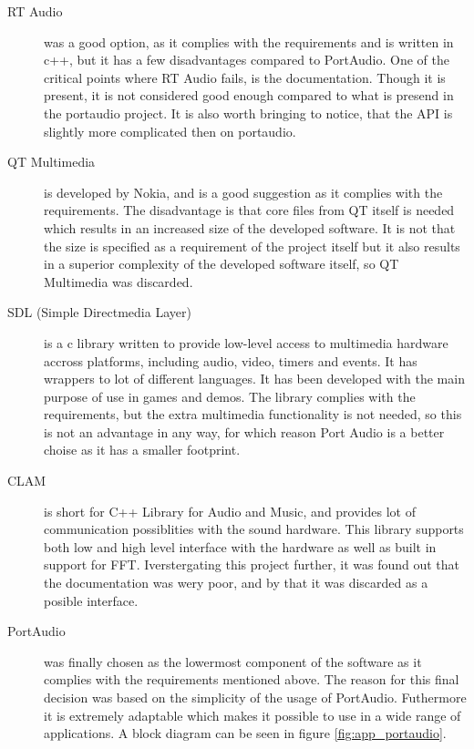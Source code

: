 \begin{description}
\item[RT Audio\footnotemark] was a good option, as it complies with the requirements and is written in c++, but it has a few disadvantages compared to PortAudio. One of the critical points where RT Audio fails, is the documentation. Though it is present, it is not considered good enough compared to what is presend in the portaudio project. It is also worth bringing to notice, that the API is slightly more complicated then on portaudio.



\item[QT Multimedia\footnotemark] is developed by Nokia, and is a good suggestion as it complies with the requirements. The disadvantage is that core files from QT itself is needed which results in an increased size of the developed software. It is not that the size is specified as a requirement of the project itself but it also results in a superior complexity of the developed software itself, so QT Multimedia was discarded.

\item[SDL (Simple Directmedia Layer)\footnotemark]
 is a c library written to provide low-level access to multimedia hardware accross platforms, including audio, video, timers and events. It has wrappers to lot of different languages. It has been developed with the main purpose of use in games and demos. The library complies with the requirements, but the extra multimedia functionality is not needed, so this is not an advantage in any way, for which reason Port Audio is a better choise as it has a smaller footprint.

\item[CLAM\footnotemark] is short for C++ Library for Audio and Music, and provides lot of communication possiblities with the sound hardware. This library supports both low and high level interface with the hardware as well as built in support for FFT. Iverstergating this project further, it was found out that the documentation was wery poor, and by that it was discarded as a posible interface.

\item[PortAudio\footnotemark] was finally chosen as the lowermost component of the software as it complies with the requirements mentioned above.  The reason for this final decision was based on the simplicity of the usage of PortAudio. Futhermore it is extremely adaptable which makes it possible to use in a wide range of applications. A block diagram can be seen in figure \ref{fig:app_portaudio}.
\end{description}

